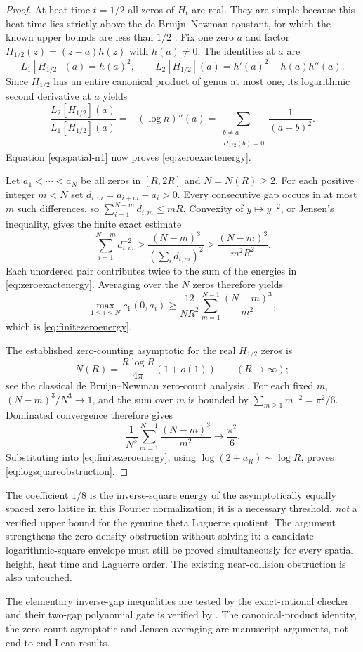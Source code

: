\begin{proof}
At heat time $t=1/2$ all zeros of $H_t$ are
real. They are simple because this heat time lies
strictly above the de Bruijn--Newman constant,
for which the known upper bounds are less than
$1/2$ \cite{Polymath15}. Fix one zero $a$ and
factor $H_{1/2}(z)=(z-a)h(z)$ with $h(a)\ne0$.
The identities at $a$ are
\[
L_1[H_{1/2}](a)=h(a)^2,\qquad
L_2[H_{1/2}](a)
=h'(a)^2-h(a)h''(a).
\]
Since $H_{1/2}$ has an entire canonical product
of genus at most one, its logarithmic second
derivative at $a$ yields
\[
\frac{L_2[H_{1/2}](a)}
{L_1[H_{1/2}](a)}
=-(\log h)''(a)
=\sum_{\substack{b\ne a\\H_{1/2}(b)=0}}
\frac1{(a-b)^2}.
\]
Equation \eqref{eq:spatial-n1} now proves
\eqref{eq:zeroexactenergy}.

Let $a_1<\cdots<a_N$ be all zeros in $[R,2R]$
and $N=N(R)\ge2$. For each positive integer
$m<N$ set
$d_{i,m}=a_{i+m}-a_i>0$.
Every consecutive gap occurs in at most
$m$ such differences, so
$\sum_{i=1}^{N-m}d_{i,m}\le mR$.
Convexity of $y\mapsto y^{-2}$, or
Jensen's inequality, gives the finite
exact estimate
\[
\sum_{i=1}^{N-m}d_{i,m}^{-2}
\ge\frac{(N-m)^3}{
 (\sum_i d_{i,m})^2}
\ge\frac{(N-m)^3}{m^2R^2}.
\]
Each unordered pair contributes twice to
the sum of the energies in
\eqref{eq:zeroexactenergy}. Averaging over
the $N$ zeros therefore yields
\[
\max_{1\le i\le N}c_1(0,a_i)
\ge\frac{12}{NR^2}
\sum_{m=1}^{N-1}\frac{(N-m)^3}{m^2},
\]
which is \eqref{eq:finitezeroenergy}.

The established zero-counting asymptotic for
the real $H_{1/2}$ zeros is
\[
N(R)=\frac{R\log R}{4\pi}(1+o(1))
\qquad(R\to\infty);
\]
see the classical de Bruijn--Newman zero-count
analysis \cite{RodgersTao,Polymath15}.
For each fixed $m$, $(N-m)^3/N^3\to1$,
and the sum over $m$ is bounded by
$\sum_{m\ge1}m^{-2}=\pi^2/6$.
Dominated convergence therefore gives
\[
\frac1{N^3}\sum_{m=1}^{N-1}
\frac{(N-m)^3}{m^2}
\longrightarrow\frac{\pi^2}{6}.
\]
Substituting into \eqref{eq:finitezeroenergy},
using $\log(2+a_R)\sim\log R$, proves
\eqref{eq:logsquareobstruction}.
\end{proof}

The coefficient $1/8$ is the inverse-square
energy of the asymptotically equally spaced
zero lattice in this Fourier normalization;
it is a necessary threshold, \emph{not}
a verified upper bound for the genuine theta
Laguerre quotient. The argument strengthens the
zero-density obstruction without solving it:
a candidate logarithmic-square envelope must
still be proved simultaneously for every
spatial height, heat time and Laguerre order.
The existing near-collision obstruction is
also untouched.

The elementary inverse-gap inequalities are
tested by the exact-rational checker
and their two-gap polynomial gate is verified by
.
The canonical-product identity, the zero-count
asymptotic and Jensen averaging are manuscript
arguments, not end-to-end Lean results.
